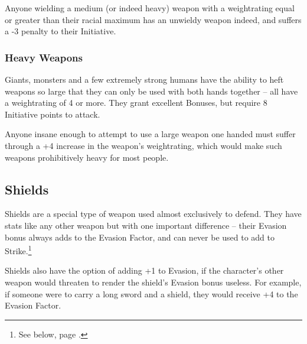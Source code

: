 \begin{multicols}{2}
Anyone wielding a medium (or indeed heavy) weapon with a \gls{weightrating} equal or greater than their racial maximum has an unwieldy weapon indeed, and suffers a -3 penalty to their Initiative.

\subsubsection{Heavy Weapons}

Giants, monsters and a few extremely strong humans have the ability to heft weapons so large that they can only be used with both hands together -- all have a \gls{weightrating} of 4 or more.
They grant excellent Bonuses, but require 8 Initiative points to attack.

Anyone insane enough to attempt to use a large weapon one handed must suffer through a +4 increase in the weapon's \gls{weightrating}, which would make such weapons prohibitively heavy for most people.

\subsection{Shields}

Shields are a special type of weapon used almost exclusively to defend.
They have stats like any other weapon but with one important difference -- their Evasion bonus always adds to the Evasion Factor, and can never be used to add to Strike.\footnote{See below, page \pageref{stances}.}

Shields also have the option of adding +1 to Evasion, if the character's other weapon would threaten to render the shield's Evasion bonus useless.
For example, if someone were to carry a long sword and a shield, they would receive +4 to the Evasion Factor.

\end{multicols}

\newcommand{\armourchart}{

	\begin{tcolorbox}[arc=1mm,tabularx={ccccc}]

	\textbf{Armour} & \textbf{\glsentrytext{dr}} & \textbf{Weight} & \textbf{Noise} & \textbf{Price} \\\hline

	Elvish & 2 & -1 & 0 & 3gp/ 9gp \\

	Padded & 2 & 2 & 0 & 1sp/ 3sp \\

	Leather & 3 & 1 & 1 & 5sp/ 15sp \\

	Chain & 4 &  2 & 3 & 10sp/ 30sp \\

	Plate & 5 &  3 & 4 & 12gp/ 36gp \\

	\end{tcolorbox}
}

